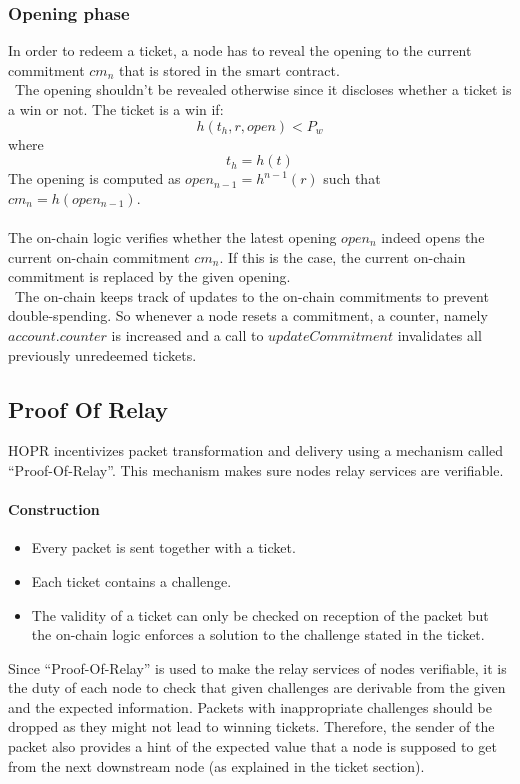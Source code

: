 \subsubsection{Opening phase}
In order to redeem a ticket, a node has to reveal the opening to the current commitment $cm_n$ that is stored in the smart contract.
\\~The opening shouldn’t be revealed otherwise since it discloses whether a ticket is a win or not.
The ticket is a win if: $$h( t_h, r, open ) <P_w$$ where $$t_h=h(t)$$
The opening is computed as $open_{n-1} = h^{n-1}(r)$ such that $cm_n=h( open_{n-1})$.
\\~\\The on-chain logic verifies whether the latest opening $open_n$ indeed opens the current on-chain commitment $cm_n$.
If this is the case, the current on-chain commitment is replaced by the given opening.
\\~The on-chain keeps track of updates to the on-chain commitments to prevent double-spending.
So whenever a node resets a commitment, a counter, namely $account.counter$ is increased and a call to $updateCommitment$ invalidates all previously unredeemed tickets.



\subsection{Proof Of Relay}

HOPR incentivizes packet transformation and delivery using a mechanism called “Proof-Of-Relay”.
This mechanism makes sure nodes relay services are verifiable.
\paragraph{Construction}
\begin{itemize}
    \item Every packet is sent together with a ticket.
    \item Each ticket contains a challenge.
    \item The validity of a ticket can only be checked on reception of the packet but the on-chain logic enforces a solution to the challenge stated in the ticket.
\end{itemize}

Since “Proof-Of-Relay” is used to make the relay services of nodes verifiable, it is the duty of each node to check that given challenges are derivable from the given and the expected information.
Packets with inappropriate challenges should be dropped as they might not lead to winning tickets.
Therefore, the sender of the packet also provides a hint of the expected value that a node is supposed to get from the next downstream node (as explained in the ticket section).

